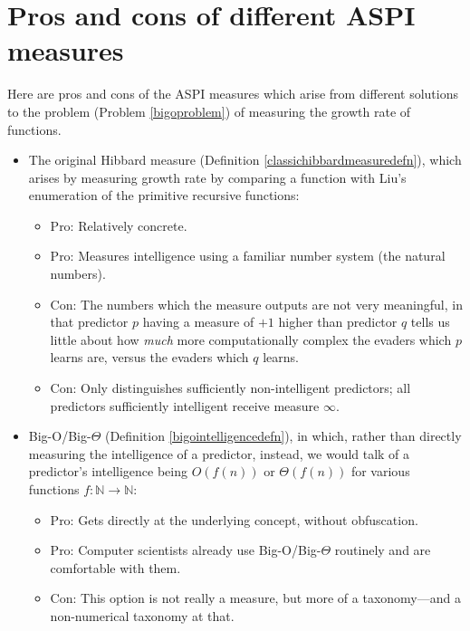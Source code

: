 \documentclass{article}
\begin{document}
\section{Pros and cons of different ASPI measures}
\label{prosandconssection}

Here are pros and cons of the ASPI measures which arise from different solutions
to the problem (Problem \ref{bigoproblem}) of measuring the growth rate of functions.

\begin{itemize}
    \item
    The original Hibbard measure (Definition \ref{classichibbardmeasuredefn}),
    which arises by measuring growth rate by comparing
    a function with Liu's enumeration \cite{liu1960enumeration} of the primitive
    recursive functions:
    \begin{itemize}
        \item
        Pro: Relatively concrete.
        \item
        Pro: Measures intelligence using a familiar number system (the natural numbers).
        \item
        Con: The numbers which the measure outputs are not very meaningful, in
        that predictor $p$ having a measure of
        $+1$ higher than predictor $q$ tells us little
        about how \emph{much} more computationally complex the evaders which $p$
        learns are, versus the evaders which $q$ learns.
        \item
        Con: Only distinguishes sufficiently non-intelligent predictors; all predictors
        sufficiently intelligent receive measure $\infty$.
    \end{itemize}
    \item
    Big-O/Big-$\Theta$ (Definition \ref{bigointelligencedefn}),
    in which, rather than directly measuring the intelligence of a predictor, instead, we
    would talk of a predictor's intelligence being $O(f(n))$ or $\Theta(f(n))$
    for various functions $f:\mathbb N\to\mathbb N$:
    \begin{itemize}
        \item
        Pro: Gets directly at the underlying concept, without obfuscation.
        \item
        Pro: Computer scientists already use Big-O/Big-$\Theta$ routinely
        and are comfortable with them.
        \item
        Con: This option is not really a measure, but more of a taxonomy---and a
        non-numerical taxonomy at that.

\end{itemize}
\end{itemize}
\end{document}
